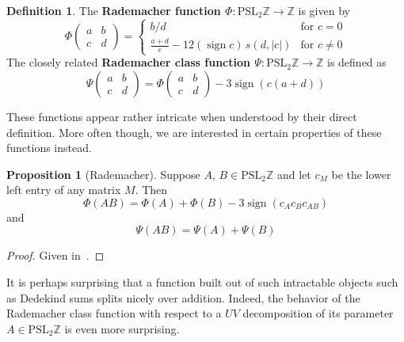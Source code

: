 \documentclass[12pt,twoside]{reedthesis}
\theoremstyle{definition}
\newtheorem{defn}[thm]{Definition}
\newtheorem{prop}[thm]{Proposition}
\newcommand{\Z}{\mathbb{Z}}
\newcommand{\PSLZ}{\mathrm{PSL}_2{\Z}}
\DeclareMathOperator{\sign}{sign}
\newcommand{\defnphrase}[1]{\textbf{#1}}
\begin{document}
\begin{defn}
  The \defnphrase{Rademacher function $\Phi : \PSLZ \to \Z$} is given by
  \begin{equation*}
    \Phi \begin{pmatrix}
      a & b \\
      c & d
    \end{pmatrix} = \begin{cases}
    b/d & \text{for $c = 0$} \\
    \frac{a + d}{c} - 12 (\sign c)\, s(d, |c|) & \text{for $c \neq 0$}
    \end{cases}
  \end{equation*}
  The closely related \defnphrase{Rademacher class function $\Psi : \PSLZ \to \Z$} is defined as
  \begin{equation*}
    \Psi \begin{pmatrix}
      a & b \\ c & d
    \end{pmatrix} = \Phi \begin{pmatrix}
      a & b \\ c & d
    \end{pmatrix} - 3 \sign(c(a + d))
  \end{equation*}
\end{defn}

These functions appear rather intricate when understood by their direct definition. More often though, we are interested in certain properties of these functions instead.

\begin{prop}[Rademacher]
 Suppose $A,\, B \in \PSLZ$ and let $c_M$ be the lower left entry of any matrix $M$.
 Then
 \begin{equation*}
   \Phi(AB) = \Phi(A) + \Phi(B) - 3 \sign(c_A c_B c_{AB})
 \end{equation*}
 and
 \begin{equation*}
   \Psi(AB) = \Psi(A) + \Psi(B)
 \end{equation*}
\end{prop}

\begin{proof}
  Given in~\cite{rademacher1956}.
\end{proof}

It is perhaps surprising that a function built out of such intractable objects such as Dedekind sums splits nicely over addition. Indeed, the behavior of the Rademacher class function with respect to a $UV$ decomposition of its parameter $A \in \PSLZ$ is even more surprising.
\end{document}
